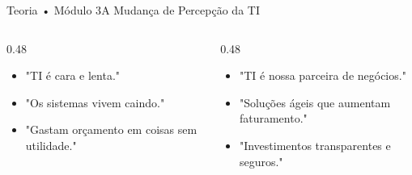 \begin{senaiframe}{Teoria • Módulo 3}{A Mudança de Percepção da TI}
  \begin{columns}[t]
    \begin{column}{0.48\textwidth}
      \begin{tcolorbox}[senairedcard, title={Percepção Negativa (Sem Governança)}]
        \begin{itemize}
          \item "TI é cara e lenta."
          \item "Os sistemas vivem caindo."
          \item "Gastam orçamento em coisas sem utilidade."
        \end{itemize}
      \end{tcolorbox}
    \end{column}
    \begin{column}{0.48\textwidth}
      \begin{tcolorbox}[senaigreencard, title={Percepção Positiva (Com Governança)}]
        \begin{itemize}
          \item "TI é nossa parceira de negócios."
          \item "Soluções ágeis que aumentam faturamento."
          \item "Investimentos transparentes e seguros."
        \end{itemize}
      \end{tcolorbox}
    \end{column}
  \end{columns}
\end{senaiframe}

